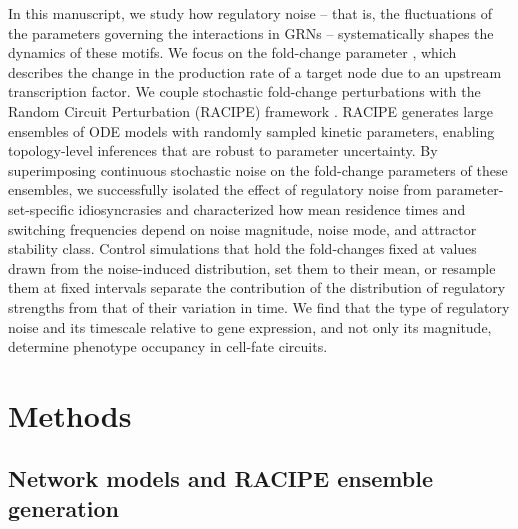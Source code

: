\documentclass[11pt]{article}
\providecommand{\DIFaddtex}[1]{{\protect\color{red}#1}} %
\providecommand{\DIFdeltex}[1]{} %
\providecommand{\DIFaddbegin}{} %
\providecommand{\DIFaddend}{} %
\providecommand{\DIFdelbegin}{} %
\providecommand{\DIFdelend}{} %
\providecommand{\DIFadd}[1]{\texorpdfstring{\DIFaddtex{#1}}{#1}} %
\providecommand{\DIFdel}[1]{\texorpdfstring{\DIFdeltex{#1}}{}} %
\providecommand{\DIFaddincludegraphics}[2][]{\DIFOincludegraphics[#1]{#2}} %
\providecommand{\DIFdelincludegraphics}[2][]{}
\DeclareRobustCommand{\DIFaddbegin}{\DIFOaddbegin \let\includegraphics\DIFaddincludegraphics} %
\DeclareRobustCommand{\DIFaddend}{\DIFOaddend \let\includegraphics\DIFOincludegraphics} %
\DeclareRobustCommand{\DIFdelbegin}{\DIFOdelbegin \let\includegraphics\DIFdelincludegraphics} %
\DeclareRobustCommand{\DIFdelend}{\DIFOaddend \let\includegraphics\DIFOincludegraphics} %
\begin{document}
In this manuscript, we study how regulatory noise – that is, the fluctuations of the parameters governing the interactions in GRNs – systematically shapes the dynamics of these motifs. We focus on the fold-change parameter \cite{Huang2017}, which describes the change in the production rate of a target node due to an upstream transcription factor. We couple stochastic fold-change perturbations with the Random Circuit Perturbation (RACIPE) framework \cite{Huang2017}. RACIPE generates large ensembles of ODE models with randomly sampled kinetic parameters, enabling topology-level inferences that are robust to parameter uncertainty. By superimposing continuous stochastic noise on the fold-change parameters of these ensembles, we successfully isolated the effect of regulatory noise from parameter-set-specific idiosyncrasies and characterized how mean residence times and switching frequencies depend on noise magnitude, noise mode, and attractor stability class. \DIFdelbegin \DIFdel{Our results reveal that regulatory noise is sufficient to induce state transitions that are inaccessible in the deterministic limit, and that bistable and tristable parameter regimes differ qualitatively in their susceptibility to such noise. Therefore, our results demonstrate }\DIFdelend \DIFaddbegin \DIFadd{Control simulations that hold the fold-changes fixed at values drawn from the noise-induced distribution, set them to their mean, or resample them at fixed intervals separate the contribution of the distribution of regulatory strengths from that of their variation in time. We find }\DIFaddend that the type of regulatory noise \DIFdelbegin \DIFdel{, not just }\DIFdelend \DIFaddbegin \DIFadd{and its timescale relative to gene expression, and not only }\DIFaddend its magnitude, \DIFdelbegin \DIFdel{is a key determinant of phenotypic plasticity }\DIFdelend \DIFaddbegin \DIFadd{determine phenotype occupancy }\DIFaddend in cell-fate circuits.

\section{Methods}

\subsection{Network models and RACIPE ensemble generation}\label{sec:RACIPE}
\end{document}
